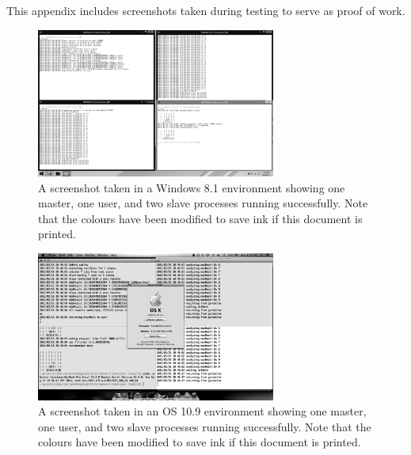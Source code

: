 \documentclass[pdftex,12pt,a4paper]{article}
\begin{document}
This appendix includes screenshots taken during testing to serve as proof of work.

\begin{figure}[h]
\begin{center}
\includegraphics[width=0.7\textwidth]{img/win8}
\caption{A screenshot taken in a Windows 8.1 environment showing one master, one user, and two slave processes running successfully. Note that the colours have been modified to save ink if this document is printed.}
\label{fig:win8}
\end{center}
\end{figure}

\begin{figure}[h]
\begin{center}
\includegraphics[width=0.7\textwidth]{img/osx}
\caption{A screenshot taken in an OS 10.9 environment showing one master, one user, and two slave processes running successfully. Note that the colours have been modified to save ink if this document is printed.}
\label{fig:osx}
\end{center}
\end{figure}
\end{document}
